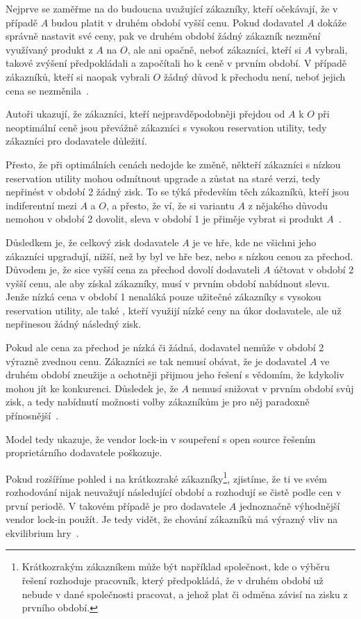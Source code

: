 \begin{multicols}{2}
	Nejprve se zaměřme na do budoucna uvažující zákazníky, kteří očekávají, že v případě $A$ budou platit v druhém období vyšší cenu. Pokud dodavatel $A$ dokáže správně nastavit své ceny, pak ve druhém období žádný zákazník nezmění využívaný produkt z $A$ na $O$, ale ani opačně, neboť zákazníci, kteří si $A$ vybrali, takové zvýšení předpokládali a započítali ho k ceně v prvním období. V případě zákazníků, kteří si naopak vybrali $O$ žádný důvod k přechodu není, neboť jejich cena se nezměnila~\cite[kap. 3: Lemma 1]{lock-in-competition}.

	Autoři ukazují, že zákazníci, kteří nejpravděpodobněji přejdou od $A$ k $O$ při neoptimální ceně jsou převážně zákazníci s vysokou reservation utility, tedy zákazníci pro dodavatele důležití.

	Přesto, že při optimálních cenách nedojde ke změně, někteří zákazníci s nízkou reservation utility mohou odmítnout upgrade a zůstat na staré verzi, tedy nepřinést v období 2 žádný zisk. To se týká především těch zákazníků, kteří jsou indiferentní mezi $A$ a $O$, a přesto, že ví, že si variantu $A$ z nějakého důvodu nemohou v období 2 dovolit, sleva v období 1 je přiměje vybrat si produkt $A$~\cite[str. 6]{lock-in-competition}.

	Důsledkem je, že celkový zisk dodavatele $A$ je ve hře, kde ne všichni jeho zákazníci upgradují, nižší, než by byl ve hře bez, nebo s nízkou cenou za přechod. Důvodem je, že sice vyšší cena za přechod dovolí dodavateli $A$ účtovat v období 2 vyšší cenu, ale aby získal zákazníky, musí v prvním období nabídnout slevu. Jenže nízká cena v období 1 nenaláká pouze užitečné zákazníky s vysokou reservation utility, ale také , kteří využijí nízké ceny na úkor dodavatele, ale už nepřinesou žádný následný zisk.

	Pokud ale cena za přechod je nízká či žádná, dodavatel nemůže v období 2 výrazně zvednou cenu. Zákazníci se tak nemusí obávat, že je dodavatel $A$ ve druhém období zneužije a ochotněji přijmou jeho řešení s vědomím, že kdykoliv mohou jít ke konkurenci. Důsledek je, že $A$ nemusí snižovat v prvním období svůj zisk, a tedy nabídnutí možnosti volby zákazníkům je pro něj paradoxně přínosnější~\cite[str. 7 a kap. 3: lemma 2]{lock-in-competition}.

	Model tedy ukazuje, že vendor lock-in v soupeření s open source řešením proprietárního dodavatele poškozuje.

	Pokud rozšíříme pohled i na krátkozraké zákazníky\footnote{Krátkozrakým zákazníkem může být například společnost, kde o výběru řešení rozhoduje pracovník, který předpokládá, že v druhém období už nebude v dané společnosti pracovat, a jehož plat či odměna závisí na zisku z prvního období.}, zjistíme, že ti ve svém rozhodování nijak neuvažují následující období a rozhodují se čistě podle cen v první periodě. V takovém případě je pro dodavatele $A$ jednoznačně výhodnější vendor lock-in použít. Je tedy vidět, že chování zákazníků má výrazný vliv na ekvilibrium hry~\cite[kap. 4]{lock-in-competition}.


\end{multicols}
